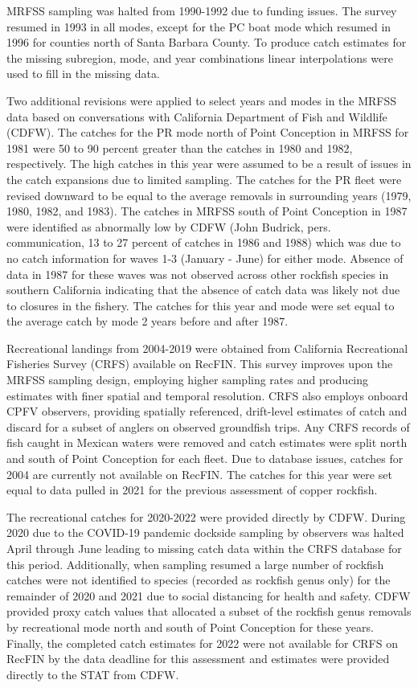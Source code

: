 \documentclass[11pt,
  english,
  letterpaper,
]{article}
\begin{document}
MRFSS sampling was halted from 1990-1992 due to funding issues. The survey resumed in 1993 in all modes, except for the PC boat mode which resumed in 1996 for counties north of Santa Barbara County. To produce catch estimates for the missing subregion, mode, and year combinations linear interpolations were used to fill in the missing data.

Two additional revisions were applied to select years and modes in the MRFSS data based on conversations with California Department of Fish and Wildlife (CDFW). The catches for the PR mode north of Point Conception in MRFSS for 1981 were 50 to 90 percent greater than the catches in 1980 and 1982, respectively. The high catches in this year were assumed to be a result of issues in the catch expansions due to limited sampling. The catches for the PR fleet were revised downward to be equal to the average removals in surrounding years (1979, 1980, 1982, and 1983). The catches in MRFSS south of Point Conception in 1987 were identified as abnormally low by CDFW (John Budrick, pers. communication, 13 to 27 percent of catches in 1986 and 1988) which was due to no catch information for waves 1-3 (January - June) for either mode. Absence of data in 1987 for these waves was not observed across other rockfish species in southern California indicating that the absence of catch data was likely not due to closures in the fishery. The catches for this year and mode were set equal to the average catch by mode 2 years before and after 1987.

Recreational landings from 2004-2019 were obtained from California Recreational Fisheries Survey (CRFS) available on RecFIN. This survey improves upon the MRFSS sampling design, employing higher sampling rates and producing estimates with finer spatial and temporal resolution. CRFS also employs onboard CPFV observers, providing spatially referenced, drift-level estimates of catch and discard for a subset of anglers on observed groundfish trips. Any CRFS records of fish caught in Mexican waters were removed and catch estimates were split north and south of Point Conception for each fleet. Due to database issues, catches for 2004 are currently not available on RecFIN. The catches for this year were set equal to data pulled in 2021 for the previous assessment of copper rockfish.

The recreational catches for 2020-2022 were provided directly by CDFW. During 2020 due to the COVID-19 pandemic dockside sampling by observers was halted April through June leading to missing catch data within the CRFS database for this period. Additionally, when sampling resumed a large number of rockfish catches were not identified to species (recorded as rockfish genus only) for the remainder of 2020 and 2021 due to social distancing for health and safety. CDFW provided proxy catch values that allocated a subset of the rockfish genus removals by recreational mode north and south of Point Conception for these years. Finally, the completed catch estimates for 2022 were not available for CRFS on RecFIN by the data deadline for this assessment and estimates were provided directly to the STAT from CDFW.
\end{document}
